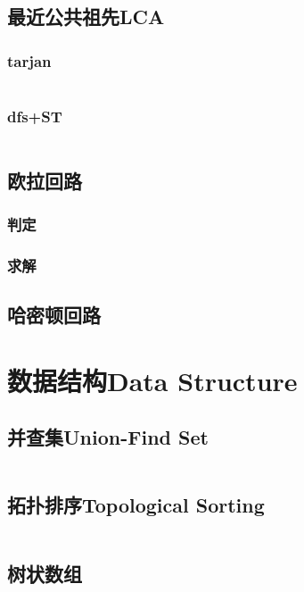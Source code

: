 \documentclass[twoside,sub3section,UTF8]{ctexart}						%
\begin{document}
	\subsection{最近公共祖先LCA}
		\subsubsection{tarjan}
		\inputminted{c++}{"Gragh Theory/LeastCommonAncestors/tarjan.cpp"}
		\subsubsection{dfs+ST}
		\inputminted{c++}{"Gragh Theory/LeastCommonAncestors/dfs+ST.cpp"}

	\subsection{欧拉回路}
		\subsubsection{判定}
		\subsubsection{求解}

	\subsection{哈密顿回路}


\newpage
\section{数据结构Data Structure}
	\subsection{并查集Union-Find Set}
	\inputminted{c++}{"Data Structure/union-find-set.cpp"}
	\subsection{拓扑排序Topological Sorting}
	\inputminted{c++}{"Data Structure/topo.cpp"}
	\subsection{树状数组}
		\inputminted{c++}{"Data Structure/BinaryIndexedTree.cpp"}
\end{document}
